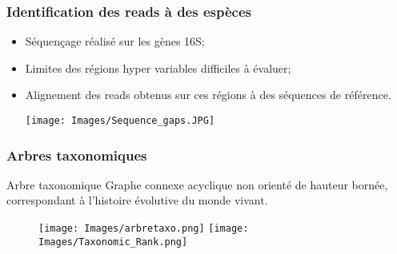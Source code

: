 \documentclass{beamer}
\begin{document}
\begin{frame}
\frametitle{Identification des reads à des espèces}

\begin{itemize}
\item Séquençage réalisé sur les gènes 16S;
\bigskip
\item Limites des \alert{régions hyper variables} difficiles à évaluer;
\bigskip
\item \alert{Alignement} des reads obtenus sur ces régions à des séquences de référence.

\begin{center}
\texttt{[image: Images/Sequence\_gaps.JPG]}
\end{center}

\end{itemize}

\end{frame}

\begin{frame}
\frametitle{Arbres taxonomiques}

\begin{block}{Arbre taxonomique} Graphe connexe acyclique non orienté de hauteur bornée, correspondant à l'histoire évolutive du monde vivant.
\end{block}


\begin{figure}
\subfigure\texttt{[image: Images/arbretaxo.png]}
\subfigure\texttt{[image: Images/Taxonomic\_Rank.png]}
\end{figure}


\end{frame}
\end{document}
